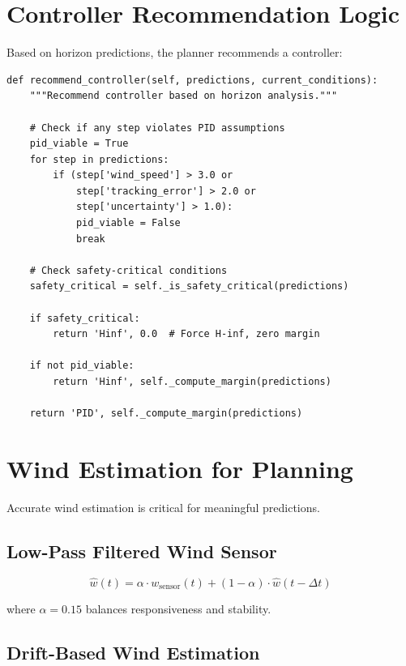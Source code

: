 \section{Controller Recommendation Logic}

Based on horizon predictions, the planner recommends a controller:

\begin{lstlisting}[caption={Controller recommendation algorithm}]
def recommend_controller(self, predictions, current_conditions):
    """Recommend controller based on horizon analysis."""

    # Check if any step violates PID assumptions
    pid_viable = True
    for step in predictions:
        if (step['wind_speed'] > 3.0 or
            step['tracking_error'] > 2.0 or
            step['uncertainty'] > 1.0):
            pid_viable = False
            break

    # Check safety-critical conditions
    safety_critical = self._is_safety_critical(predictions)

    if safety_critical:
        return 'Hinf', 0.0  # Force H-inf, zero margin

    if not pid_viable:
        return 'Hinf', self._compute_margin(predictions)

    return 'PID', self._compute_margin(predictions)
\end{lstlisting}

\section{Wind Estimation for Planning}

Accurate wind estimation is critical for meaningful predictions.

\subsection{Low-Pass Filtered Wind Sensor}

\begin{equation}
    \hat{w}(t) = \alpha \cdot w_{\text{sensor}}(t) + (1 - \alpha) \cdot \hat{w}(t - \Delta t)
\end{equation}

where $\alpha = 0.15$ balances responsiveness and stability.

\subsection{Drift-Based Wind Estimation}

